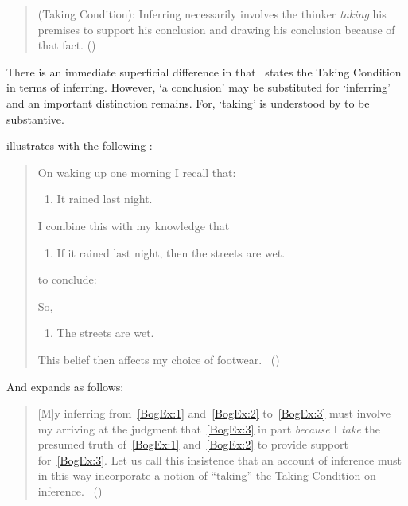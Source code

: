 \begin{note}
  \begin{quote}
    (Taking Condition):
    Inferring necessarily involves the thinker \emph{taking} his premises to support his conclusion and drawing his conclusion because of that fact.%
    \mbox{}\hfill\mbox{(\citeyear[5]{Boghossian:2014aa})}
  \end{quote}

  There is an immediate superficial difference in that~\citeauthor{Boghossian:2014aa} states the Taking Condition in terms of inferring.
  However, `a conclusion' may be substituted for `inferring' and an important distinction remains.
  For, `taking' is understood by \citeauthor{Boghossian:2014aa} to be substantive.

  \citeauthor{Boghossian:2014aa} illustrates with the following \scen{}:
  \begin{quote}
    On waking up one morning I recall that:

    \begin{enumerate}[label=(\arabic*), ref=(\arabic*), series=BogEx]
    \item
      \label{BogEx:1}
      It rained last night.
    \end{enumerate}

    I combine this with my knowledge that

    \begin{enumerate}[label=(\arabic*), ref=(\arabic*), resume*=BogEx]
    \item
      \label{BogEx:2}
      If it rained last night, then the streets are wet.
    \end{enumerate}

    to conclude:

    So,

    \begin{enumerate}[label=(\arabic*), ref=(\arabic*), resume*=BogEx]
    \item
      \label{BogEx:3}
      The streets are wet.
    \end{enumerate}
    This belief then affects my choice of footwear.%
    \mbox{ }\hfill\mbox{(\citeyear[2]{Boghossian:2014aa})}
  \end{quote}

  And \citeauthor{Boghossian:2014aa} expands as follows:

  \begin{quote}
    [M]y inferring from~\ref{BogEx:1} and~\ref{BogEx:2} to~\ref{BogEx:3} must involve my arriving at the judgment that~\ref{BogEx:3} in part \emph{because} I \emph{take} the presumed truth of~\ref{BogEx:1} and~\ref{BogEx:2} to provide support for~\ref{BogEx:3}.
    Let us call this insistence that an account of inference must in this way incorporate a notion of ``taking'' the Taking Condition on inference.%
    \mbox{ }\hfill\mbox{(\citeyear[4]{Boghossian:2014aa})}
  \end{quote}


\end{note}
